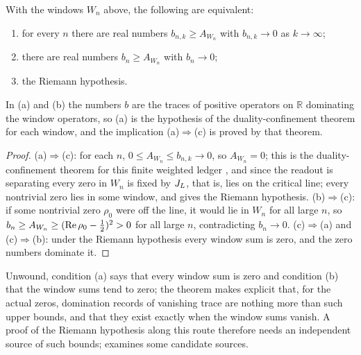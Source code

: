 \begin{theorem}
\label{thm:rh:concrete-window-dc}
With the windows \(W_n\) above, the following are equivalent:
\begin{enumerate}[label=\textup{(\alph*)}]
  \item for every \(n\) there are real numbers \(b_{n,k}\geq A_{W_n}\)
    with \(b_{n,k}\to0\) as \(k\to\infty\);
  \item there are real numbers \(b_n\geq A_{W_n}\) with \(b_n\to0\);
  \item the Riemann hypothesis.
\end{enumerate}
In (a) and (b) the numbers \(b\) are the traces of positive operators
on \(\mathbb R\) dominating the window operators, so (a) is the
hypothesis of the duality-confinement theorem for each window, and the
implication (a)\(\Rightarrow\)(c) is proved by that theorem.
\end{theorem}

\begin{proof}
(a)\(\Rightarrow\)(c): for each \(n\), \(0\leq A_{W_n}\leq b_{n,k}\to0\), so
\(A_{W_n}=0\); this is the duality-confinement theorem for this finite
weighted ledger \citep[Theorem~7.1]{TsiokosSDTC2026}, and since the readout
is separating every zero in \(W_n\) is fixed by \(J_{L}\), that is, lies on
the critical line; every nontrivial zero lies in some
window, and  gives the Riemann hypothesis.
(b)\(\Rightarrow\)(c): if some nontrivial zero \(\rho_0\) were off the
line, it would lie in \(W_n\) for all large \(n\), so
\(b_n\geq A_{W_n}\geq(\operatorname{Re}\rho_0-\frac12)^2>0\) for all large \(n\),
contradicting \(b_n\to0\).  (c)\(\Rightarrow\)(a) and
(c)\(\Rightarrow\)(b): under the Riemann hypothesis every window sum is
zero, and the zero numbers dominate it.
\end{proof}

Unwound, condition (a) says that every window sum is zero and
condition (b) that the window sums tend to zero; the theorem makes
explicit that, for the actual zeros, domination records of vanishing
trace are nothing more than such upper bounds, and that they exist
exactly when the window sums vanish.  A
proof of the Riemann hypothesis along this route therefore needs an
independent source of such bounds;  examines
some candidate sources.
